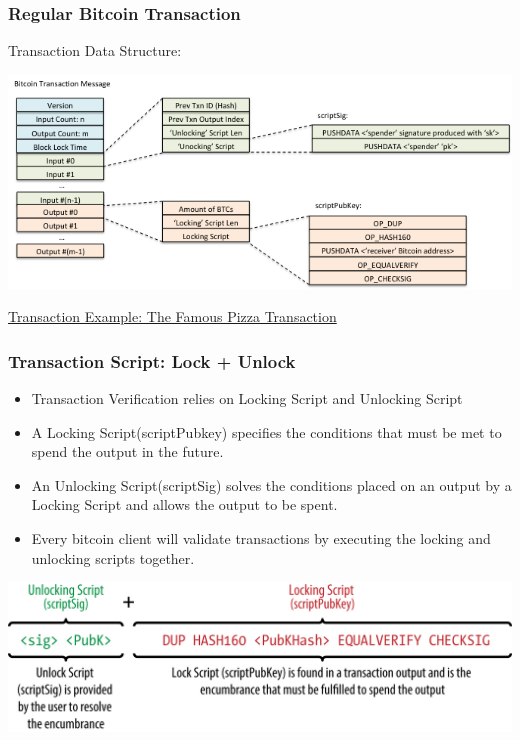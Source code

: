 \begin{frame}
    \frametitle{Regular Bitcoin Transaction}
    Transaction Data Structure:
    \begin{center}
        \includegraphics[scale=0.6]{./figures/bitcoin-transaction0.png} \\
    \end{center}
    \href{https://blockchain.info/tx/cca7507897abc89628f450e8b1e0c6fca4ec3f7b34cccf55f3f531c659ff4d79}{Transaction Example: The Famous Pizza Transaction}
\end{frame}

\begin{frame}
    \frametitle{Transaction Script: Lock + Unlock}
    \begin{itemize}
        \item Transaction Verification relies on \alert{Locking Script} and \alert{Unlocking Script}
        \item A Locking Script(\alert{scriptPubkey}) specifies the conditions that must be met to spend the output in the future.
        \item An Unlocking Script(\alert{scriptSig}) solves the conditions placed on an output by a Locking Script and allows the output to be spent.
        \item Every bitcoin client will validate transactions by executing the locking and unlocking scripts together.
    \end{itemize}
    \begin{center}
        \includegraphics[scale=0.7]{./figures/mbc2_0603.png}
    \end{center}
\end{frame}

